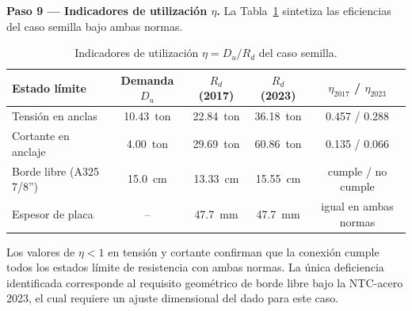 \textbf{Paso 9 — Indicadores de utilización $\eta$.}
La Tabla~\ref{tab:ejemplo_eta} sintetiza las eficiencias del caso semilla bajo ambas normas.

\begin{table}[H]
  \centering
  \caption{Indicadores de utilización $\eta = D_u / R_d$ del caso semilla.}
  \label{tab:ejemplo_eta}
  \begin{tabular}{lcccc}
    \toprule
    Estado límite & Demanda $D_u$ & $R_d$ (2017) & $R_d$ (2023) & $\eta_{2017}$ / $\eta_{2023}$ \\
    \midrule
    Tensión en anclas     & 10.43~ton & 22.84~ton & 36.18~ton & 0.457 / 0.288 \\
    Cortante en anclaje   & 4.00~ton  & 29.69~ton & 60.86~ton & 0.135 / 0.066 \\
    Borde libre (A325 7/8'') & 15.0~cm & 13.33~cm  & 15.55~cm  & cumple / no cumple \\
    Espesor de placa      & --        & 47.7~mm   & 47.7~mm   & igual en ambas normas \\
    \bottomrule
  \end{tabular}
\end{table}

Los valores de $\eta < 1$ en tensión y cortante confirman que la conexión cumple todos los
estados límite de resistencia con ambas normas. La única deficiencia identificada corresponde
al requisito geométrico de borde libre bajo la NTC-acero 2023, el cual requiere un ajuste
dimensional del dado para este caso.
